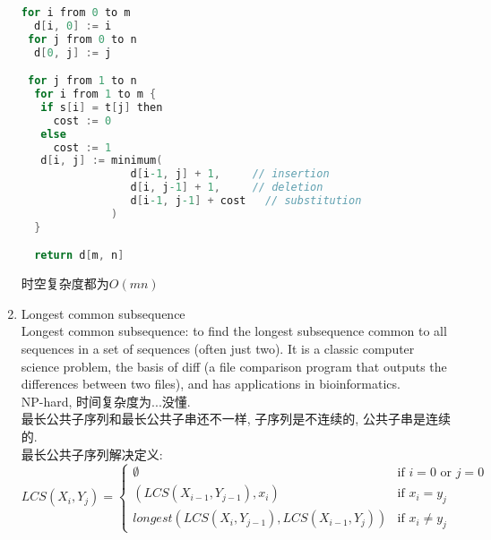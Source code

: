 \documentclass[a4paper,10pt,english]{article}
\begin{document}
\begin{enumerate}
\begin{lstlisting}[language=C]
 for i from 0 to m
  d[i, 0] := i
 for j from 0 to n
  d[0, j] := j

 for j from 1 to n
  for i from 1 to m {
   if s[i] = t[j] then 
     cost := 0
   else
     cost := 1
   d[i, j] := minimum(
                 d[i-1, j] + 1,     // insertion
                 d[i, j-1] + 1,     // deletion
                 d[i-1, j-1] + cost   // substitution
              )
  }

  return d[m, n]
\end{lstlisting}
时空复杂度都为$O(mn)$

\item{Longest common subsequence}\\
Longest common subsequence: to find the longest subsequence common to all sequences in a set of sequences (often just two). It is a classic computer science problem, the basis of diff (a file comparison program that outputs the differences between two files), and has applications in bioinformatics.\\
NP-hard, 时间复杂度为...没懂. \\
最长公共子序列和最长公共子串还不一样, 子序列是不连续的, 公共子串是连续的. \\
最长公共子序列解决定义:
\begin{displaymath}
LCS(X_i, Y_j) = \left\lbrace \begin{array}{ll}
\emptyset & \textrm{if $i = 0$ or $j = 0$} \\
(LCS(X_{i-1}, Y_{j-1}), x_i) & \textrm{if $x_i = y_j$} \\
longest(LCS(X_i, Y_{j-1}), LCS(X_{i-1}, Y_j)) & \textrm{if $x_i \neq y_j$}
\end{array} \right.
\end{displaymath}


\end{enumerate}
\end{document}
